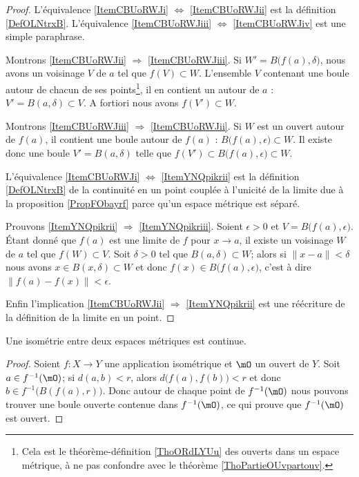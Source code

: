 \begin{proof}
    L'équivalence \ref{ItemCBUoRWJi} \( \Leftrightarrow\) \ref{ItemCBUoRWJii} est la définition \ref{DefOLNtrxB}. L'équivalence \ref{ItemCBUoRWJiii} \( \Leftrightarrow\) \ref{ItemCBUoRWJiv} est une simple paraphrase.

    Montrons \ref{ItemCBUoRWJii} \( \Rightarrow\) \ref{ItemCBUoRWJiii}. Si \( W'=B\big( f(a),\delta \big)\), nous avons un voisinage \( V\) de \( a\) tel que \( f(V)\subset W\). L'ensemble \( V\) contenant une boule autour de chacun de ses points\footnote{Cela est le théorème-définition \ref{ThoORdLYUu} des ouverts dans un espace métrique, à ne pas confondre avec le théorème \ref{ThoPartieOUvpartouv}.}, il en contient un autour de \( a\) : \( V'=B(a,\delta)\subset V\). A fortiori nous avons \( f(V')\subset W\).

    Montrons \ref{ItemCBUoRWJiii} \( \Rightarrow\) \ref{ItemCBUoRWJii}. Si \( W\) est un ouvert autour de \( f(a)\), il contient une boule autour de \( f(a)\) : \( B\big( f(a),\epsilon \big)\subset W\). Il existe donc une boule \( V'=B(a,\delta)\) telle que \( f(V')\subset B\big( f(a),\epsilon \big)\subset W\).

    L'équivalence \ref{ItemCBUoRWJi} \( \Leftrightarrow\) \ref{ItemYNQpikrii} est la définition \ref{DefOLNtrxB} de la continuité en un point couplée à l'unicité de la limite due à la proposition \ref{PropFObayrf} parce qu'un espace métrique est séparé.

    Prouvons \ref{ItemYNQpikrii} \( \Rightarrow\) \ref{ItemYNQpikriii}. Soient \( \epsilon>0\) et \( V=B\big( f(a),\epsilon \big)\). Étant donné que \( f(a)\) est une limite de \( f\) pour \( x\to a\), il existe un voisinage \( W\) de \( a\) tel que \( f(W)\subset V\). Soit \( \delta>0\) tel que \( B(a,\delta)\subset W\); alors si \( \| x-a \|<\delta\) nous avons \( x\in B(x,\delta)\subset W\) et donc \( f(x)\in B\big( f(a),\epsilon \big)\), c'est à dire \( \| f(a)-f(x) \|<\epsilon\).

    Enfin l'implication \ref{ItemCBUoRWJii} \( \Rightarrow\) \ref{ItemYNQpikrii} est une réécriture de la définition de la limite en un point.
\end{proof}

\begin{proposition}\label{PropLYMgVMJ}
    Une isométrie entre deux espaces métriques est continue.
\end{proposition}

\begin{proof}
    Soient \( f\colon X\to Y\) une application isométrique et \( \mO\) un ouvert de \( Y\). Soit \( a\in f^{-1}(\mO)\); si \( d(a,b)<r\), alors \( d\big( f(a),f(b) \big)<r\) et donc \( b\in f^{-1}\big( B(f(a),r) \big)\). Donc autour de chaque point de \( f^{-1}(\mO)\) nous pouvons trouver une boule ouverte contenue dans \( f^{-1}(\mO)\), ce qui prouve que \( f^{-1}(\mO)\) est ouvert.
\end{proof}

